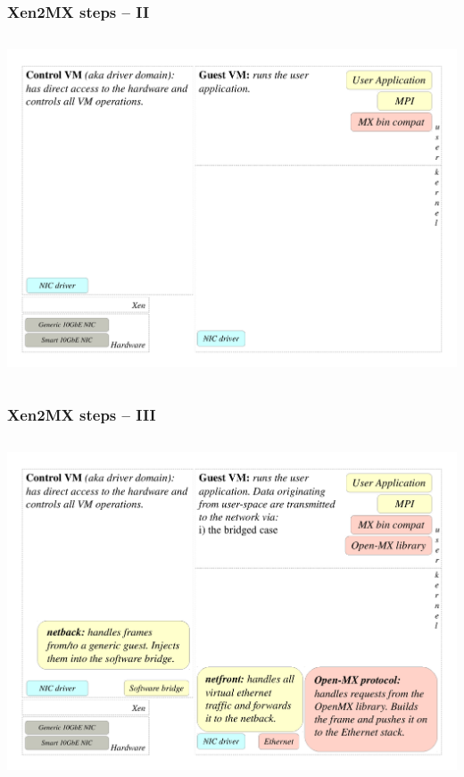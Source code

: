 \documentclass[red,slidestop,notes,compress,mathserif]{beamer}
\begin{document}
\begin{frame}
\frametitle{Xen2MX steps -- II}
\begin{columns}
\includegraphics[width=\textwidth]{figs/bare/xen2mx_step2.pdf}
\end{columns}
\end{frame}

\begin{frame}
\frametitle{Xen2MX steps -- III}
\begin{columns}
\includegraphics[width=\textwidth]{figs/bare/xen2mx_step3.pdf}
\end{columns}
\end{frame}
\end{document}
